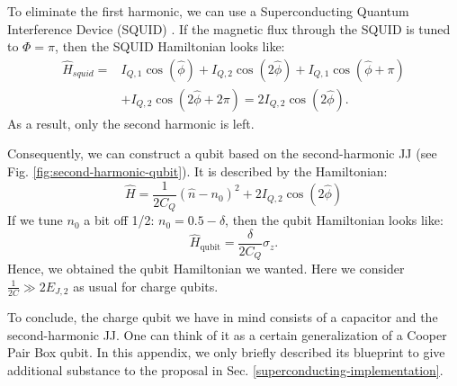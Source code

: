 \documentclass[reprint, aps, prx, amsmath, amssymb, longbibliography, superscriptaddress]{revtex4-2}
\begin{document}
To eliminate the first harmonic, we can use a Superconducting Quantum Interference Device (SQUID) \cite{valentini_parityconserving_2024}. If the magnetic flux through the SQUID is tuned to $\Phi = \pi$, then the SQUID Hamiltonian looks like:
\begin{equation}
\begin{aligned}
    \hat H_{squid} = &I_{Q,1} \cos(\hat \phi) + I_{Q,2} \cos(2\hat \phi) + I_{Q,1} \cos(\hat \phi + \pi) \\
    &+ I_{Q,2} \cos(2\hat \phi + 2\pi) = 2 I_{Q,2} \cos(2\hat \phi).
\end{aligned}
\end{equation}
As a result, only the second harmonic is left.

Consequently, we can construct a qubit based on the second-harmonic JJ (see Fig. \ref{fig:second-harmonic-qubit}). It is described by the Hamiltonian:
\begin{equation}
\label{second-harmonic-qubit}
    \hat H = \frac{1}{2C_Q} (\hat n - n_0)^2 + 2 I_{Q,2} \cos(2\hat\phi)
\end{equation}
If we tune $n_0$ a bit off 1/2: $n_0 = 0.5 - \delta$, then the qubit Hamiltonian looks like:
\begin{equation}
    \hat H_{\text{qubit}} = \frac{\delta}{2 C_Q} \sigma_z.
\end{equation}
Hence, we obtained the qubit Hamiltonian we wanted. Here we consider $\frac{1}{2C} \gg 2 E_{J,2}$ as usual for charge qubits.

To conclude, the charge qubit we have in mind consists of a capacitor and the second-harmonic JJ. One can think of it as a certain generalization of a Cooper Pair Box qubit. In this appendix, we only briefly described its blueprint to give additional substance to the proposal in Sec. \ref{superconducting-implementation}.





\end{document}
